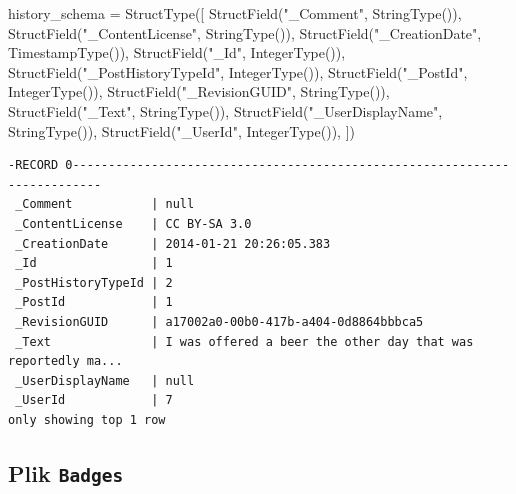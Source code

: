 \documentclass[
  letterpaper,
  DIV=11,
  numbers=noendperiod]{scrreprt}
\newenvironment{Shaded}{\begin{snugshade}}{\end{snugshade}}
\newcommand{\NormalTok}[1]{\textcolor[rgb]{0.00,0.23,0.31}{#1}}
\newcommand{\OperatorTok}[1]{\textcolor[rgb]{0.37,0.37,0.37}{#1}}
\newcommand{\StringTok}[1]{\textcolor[rgb]{0.13,0.47,0.30}{#1}}
\begin{document}
\begin{Shaded}
\begin{Highlighting}[]
\NormalTok{history\_schema }\OperatorTok{=}\NormalTok{ StructType([}
\NormalTok{    StructField(}\StringTok{"\_Comment"}\NormalTok{, StringType()),}
\NormalTok{    StructField(}\StringTok{"\_ContentLicense"}\NormalTok{, StringType()),}
\NormalTok{    StructField(}\StringTok{"\_CreationDate"}\NormalTok{, TimestampType()),}
\NormalTok{    StructField(}\StringTok{"\_Id"}\NormalTok{, IntegerType()),}
\NormalTok{    StructField(}\StringTok{"\_PostHistoryTypeId"}\NormalTok{, IntegerType()),}
\NormalTok{    StructField(}\StringTok{"\_PostId"}\NormalTok{, IntegerType()),}
\NormalTok{    StructField(}\StringTok{"\_RevisionGUID"}\NormalTok{, StringType()),}
\NormalTok{    StructField(}\StringTok{"\_Text"}\NormalTok{, StringType()),}
\NormalTok{    StructField(}\StringTok{"\_UserDisplayName"}\NormalTok{, StringType()),}
\NormalTok{    StructField(}\StringTok{"\_UserId"}\NormalTok{, IntegerType()),}
\NormalTok{])}
\end{Highlighting}
\end{Shaded}

\begin{verbatim}
-RECORD 0--------------------------------------------------------------------------
 _Comment           | null                                                         
 _ContentLicense    | CC BY-SA 3.0                                                 
 _CreationDate      | 2014-01-21 20:26:05.383                                      
 _Id                | 1                                                            
 _PostHistoryTypeId | 2                                                            
 _PostId            | 1                                                            
 _RevisionGUID      | a17002a0-00b0-417b-a404-0d8864bbbca5                         
 _Text              | I was offered a beer the other day that was reportedly ma... 
 _UserDisplayName   | null                                                         
 _UserId            | 7                                                            
only showing top 1 row
\end{verbatim}

\normalsize

\hypertarget{plik-badges}{%
\subsection{\texorpdfstring{Plik
\texttt{Badges}}{Plik Badges}}\label{plik-badges}}
\end{document}
